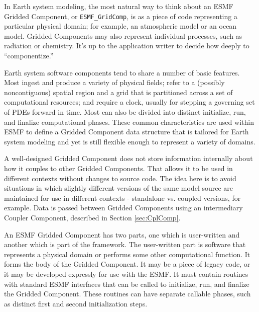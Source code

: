 %

\label{sec:GridComp}

In Earth system modeling, the most natural way to think about an ESMF 
Gridded Component, or {\tt ESMF\_GridComp}, is as a piece of code 
representing a particular physical domain; for example, an atmospheric 
model or an ocean model.  Gridded Components may also represent individual
processes, such as radiation or chemistry.  It's up to the application
writer to decide how deeply to ``componentize.''

Earth system software components tend to share a number of basic 
features.  Most ingest and produce a variety of physical fields; refer to 
a (possibly noncontiguous) spatial region and a grid that is 
partitioned across a set of computational resources; and require 
a clock, usually for stepping a governing set of PDEs forward in time.  
Most can also be divided into distinct initialize, run, and finalize 
computational phases.  These common characteristics are used 
within ESMF to define a Gridded Component data structure that 
is tailored for Earth system modeling and yet is still flexible
enough to represent a variety of domains.

A well-designed Gridded Component does not store information 
internally about how it couples to other Gridded Components.  That
allows it to be used in different contexts without changes to source
code.  The idea here is to avoid situations in which slightly
different versions of the same model source are maintained for use in 
different contexts - standalone vs. coupled versions, for example.
Data is passed between Gridded Components using an intermediary 
Coupler Component, described in Section \ref{sec:CplComp}.

An ESMF Gridded Component has two parts, one which is user-written
and another which is part of the framework.  The user-written
part is software that represents a physical domain or performs some
other computational function.  It forms the body of the Gridded 
Component.  It may be a piece of legacy code, or it may be developed 
expressly for use with the ESMF.  It must contain routines with
standard ESMF interfaces that can be called to initialize, run, and
finalize the Gridded Component.  These routines can have separate 
callable phases, such as distinct first and second initialization steps.

